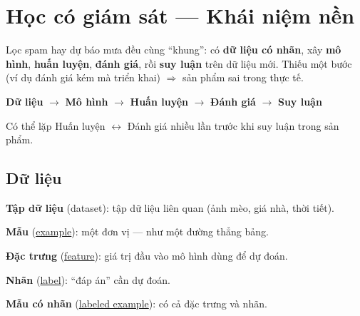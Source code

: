 \documentclass[12pt,a4paper]{article}
\begin{document}
\newpage

\section{Học có giám sát --- Khái niệm nền}

\begin{dongco}[title={Vì sao cần năm khái niệm?}]
Lọc spam hay dự báo mưa đều cùng ``khung'': có \textbf{dữ liệu có nhãn}, xây \textbf{mô hình}, \textbf{huấn luyện}, \textbf{đánh giá}, rồi \textbf{suy luận} trên dữ liệu mới. Thiếu một bước (ví dụ đánh giá kém mà triển khai) $\Rightarrow$ sản phẩm sai trong thực tế.
\end{dongco}

\begin{phuongphap}[title={Vòng đời mô hình có giám sát}]
\begin{center}
\textbf{Dữ liệu} $\longrightarrow$ \textbf{Mô hình} $\longrightarrow$ \textbf{Huấn luyện} $\longrightarrow$ \textbf{Đánh giá} $\longrightarrow$ \textbf{Suy luận}
\end{center}
Có thể lặp Huấn luyện $\leftrightarrow$ Đánh giá nhiều lần trước khi suy luận trong sản phẩm.
\end{phuongphap}

\subsection{Dữ liệu}

\begin{dinhnghia}[title={Tập dữ liệu, mẫu, đặc trưng, nhãn}]
\textbf{Tập dữ liệu} (dataset): tập dữ liệu liên quan (ảnh mèo, giá nhà, thời tiết).

\textbf{Mẫu} (\href{https://developers.google.com/machine-learning/glossary\#example}{example}): một đơn vị --- như một đường thẳng bảng.

\textbf{Đặc trưng} (\href{https://developers.google.com/machine-learning/glossary\#feature}{feature}): giá trị đầu vào mô hình dùng để dự đoán.

\textbf{Nhãn} (\href{https://developers.google.com/machine-learning/glossary\#label}{label}): ``đáp án'' cần dự đoán.

\textbf{Mẫu có nhãn} (\href{https://developers.google.com/machine-learning/glossary\#labeled-example}{labeled example}): có cả đặc trưng và nhãn.
\end{dinhnghia}
\end{document}
